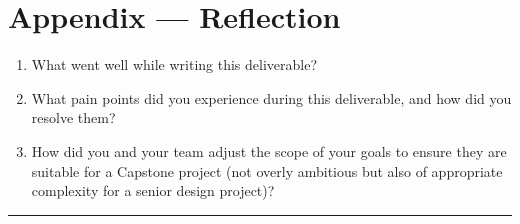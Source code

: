 \documentclass{article}
\begin{document}
\newpage{}

\section*{Appendix --- Reflection}



\begin{enumerate}
    \item What went well while writing this deliverable?
    \item What pain points did you experience during this deliverable, and how
    did you resolve them?
    \item How did you and your team adjust the scope of your goals to ensure
    they are suitable for a Capstone project (not overly ambitious but also of
    appropriate complexity for a senior design project)?
\end{enumerate}  
\noindent\rule{\linewidth}{0.4pt}
\end{document}
